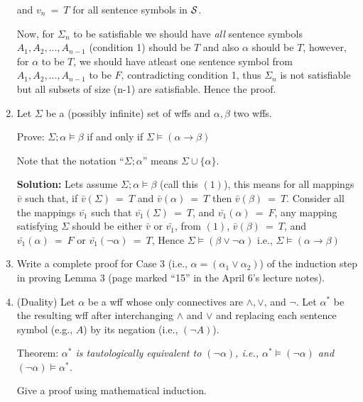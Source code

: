 \documentclass[12pt,letterpaper]{article}
\begin{document}
\begin{enumerate}
  and $v_{n}\ =\ T$ for all sentence symbols in $\cal S$.
  
  Now, for $\Sigma_{n}$ to be satisfiable we should have \textit{all} sentence symbols $A_{1}, A_{2},...,A_{n-1}$ (condition 1) should be $T$ and also $\alpha$ should be $T$, however, for $\alpha$ to be $T$, we should have atleast one sentence symbol from  $A_{1}, A_{2},...,A_{n-1}$ to be $F$, contradicting condition 1, thus $\Sigma_{n}$ is not satisfiable but all subsets of size (n-1) are satisfiable. Hence the proof.
  	
  

\item
  Let $\Sigma$ be a (possibly infinite) set of wffs and
  $\alpha,\beta$ two wffs.

  Prove: $\Sigma;\alpha\models\beta$ if and only if
  $\Sigma\models (\alpha\rightarrow\beta)$

  Note that the notation ``$\Sigma;\alpha$'' means $\Sigma\cup\{\alpha\}$.
  
  \textbf{Solution:} Lets assume $\Sigma;\alpha\models\beta$  (call this $(1)$), this means for all mappings $\bar{v}$ such that, if $\bar{v}(\Sigma)\ =\ T$ and $\bar{v}(\alpha)\ =\ T$ then $\bar{v}(\beta)\ =\ T$. 
  Consider all the mappings $\bar{v_{1}}$ such that $\bar{v_{1}}(\Sigma)\ =\ T$, and $\bar{v_{1}}(\alpha)\ =\ F$, any mapping satisfying $\Sigma$ should be either $\bar{v}$ or $\bar{v_{1}}$, from $(1)$, $\bar{v}(\beta)\ =\ T$, and $\bar{v_{1}}(\alpha)\ =\ F$ or $\bar{v_{1}}(\lnot \alpha)\ =\ T$, Hence $\Sigma\models (\beta \lor \lnot \alpha)$ i.e., 
$\Sigma\models (\alpha\rightarrow\beta)$
\item
  Write a complete proof for Case 3
  (i.e., $\alpha=(\alpha_1\lor\alpha_2)$)
  of the induction step in proving
  Lemma 3 (page marked ``15'' in the April 6's lecture notes).

\item 
  (Duality)
  Let $\alpha$ be a wff whose only connectives are $\land,\lor$,
  and $\neg$.
  Let $\alpha^*$ be the resulting wff after interchanging $\land$
  and $\lor$ and replacing each sentence symbol (e.g., $A$) by its
  negation (i.e., $(\neg A)$).
  
  {\sc Theorem:}
  {\em $\alpha^*$ is tautologically equivalent to $(\neg
    \alpha)$, i.e., $\alpha^*\models (\neg\alpha)$ and 
    $(\neg\alpha)\models\alpha^*$.}

  Give a proof using mathematical induction.
\end{enumerate}
\end{document}

